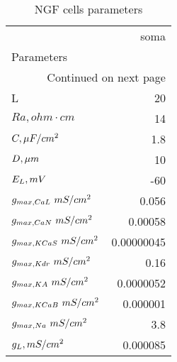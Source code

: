 \begin{longtable}{lr}
\caption{NGF cells parameters}\label{ca1__cell_parameters}\\
\toprule
{} &       soma \\
Parameters         &            \\
\midrule
\endhead
\midrule
\multicolumn{2}{r}{{Continued on next page}} \\
\midrule
\endfoot

\bottomrule
\endlastfoot
L                  &         20 \\
$Ra,
 ohm \cdot cm$                 &         14 \\
$C, \linebreak \mu F / cm^2$                 &        1.8 \\
$D,\linebreak \mu m$               &         10 \\
$E_L, \linebreak mV$          &        -60 \\
$g_{max, CaL       }\linebreak \  mS / cm^2$&      0.056 \\
$g_{max, CaN       }\linebreak \  mS / cm^2$&    0.00058 \\
$g_{max, KCaS       }\linebreak \  mS / cm^2$& 0.00000045 \\
$g_{max, Kdr }\linebreak \  mS / cm^2$&       0.16 \\
$g_{max, KA     }\linebreak \  mS / cm^2$&  0.0000052 \\
$g_{max, KCaB      }\linebreak \  mS / cm^2$&   0.000001 \\
$g_{max, Na     }\linebreak \  mS / cm^2$&        3.8 \\
$g_L, \linebreak mS / cm^2$       &   0.000085 \\
\end{longtable}
